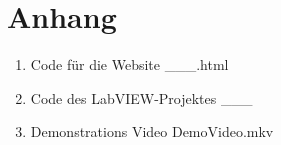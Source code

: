 \documentclass[a4paper,12pt,final]{article} %
\numberwithin{equation}{section} %
\numberwithin{figure}{section} %
\numberwithin{table}{section} %
\begin{document}
\section*{Anhang} 
\begin{enumerate}
	\item Code für die Website \_\_\_.html
	\item Code des LabVIEW-Projektes \_\_\_
	\item Demonstrations Video DemoVideo.mkv
\end{enumerate}
\newpage
\end{document}
